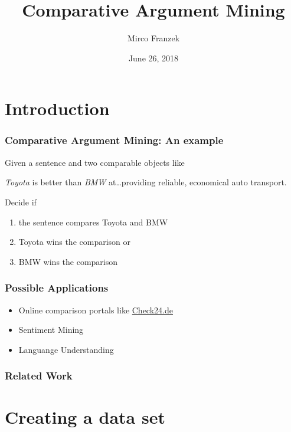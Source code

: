 \documentclass[11pt,aspectratio=169]{beamer}
\title{Comparative Argument Mining}
\author{Mirco Franzek}
\date{June 26, 2018}
\begin{document}
    \maketitle

    \section{Introduction}
    \frame{\sectionpage}

    \begin{frame}
        \frametitle{Comparative Argument Mining: An example}
        Given a sentence and two comparable objects like

        \begin{center}
            \LARGE \emph{Toyota} is better than \emph{BMW} at\ldots providing reliable, economical auto transport.
        \end{center}

        Decide if

        \begin{enumerate}
            \item the sentence compares Toyota and BMW
            \item Toyota wins the comparison or
            \item BMW wins the comparison
        \end{enumerate}

    \end{frame}

    \begin{frame}
        \frametitle{Possible Applications}

        \begin{itemize}
            \item Online comparison portals like \url{Check24.de}
            \item Sentiment Mining
            \item Languange Understanding
        \end{itemize}

    \end{frame}


    \begin{frame}
        \frametitle{Related Work}

    \end{frame}


    \section{Creating a data set}
    \frame{\sectionpage}
\end{document}
